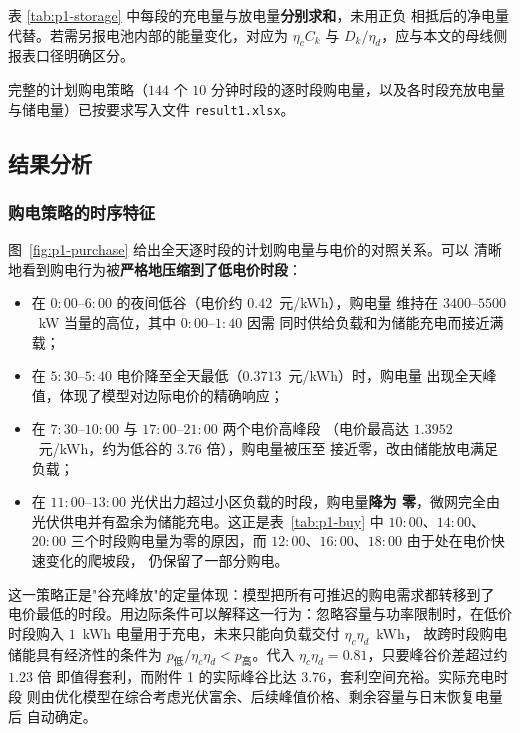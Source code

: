 \documentclass[withoutpreface,bwprint]{cumcmthesis}
\begin{document}
表 \ref{tab:p1-storage} 中每段的充电量与放电量\textbf{分别求和}，未用正负
相抵后的净电量代替。若需另报电池内部的能量变化，对应为 $\eta_c C_k$ 与
$D_k/\eta_d$，应与本文的母线侧报表口径明确区分。

完整的计划购电策略（$144$ 个 $10$ 分钟时段的逐时段购电量，以及各时段充放电量
与储电量）已按要求写入文件 \texttt{result1.xlsx}。

\subsection{结果分析}

\subsubsection{购电策略的时序特征}

图~\ref{fig:p1-purchase} 给出全天逐时段的计划购电量与电价的对照关系。可以
清晰地看到购电行为被\textbf{严格地压缩到了低电价时段}：

\begin{itemize}
  \item 在 $0{:}00$--$6{:}00$ 的夜间低谷（电价约 $0.42$~元/kWh），购电量
        维持在 $3400$--$5500$~kW 当量的高位，其中 $0{:}00$--$1{:}40$ 因需
        同时供给负载和为储能充电而接近满载；
  \item 在 $5{:}30$--$5{:}40$ 电价降至全天最低（$0.3713$~元/kWh）时，购电量
        出现全天峰值，体现了模型对边际电价的精确响应；
  \item 在 $7{:}30$--$10{:}00$ 与 $17{:}00$--$21{:}00$ 两个电价高峰段
        （电价最高达 $1.3952$~元/kWh，约为低谷的 $3.76$ 倍），购电量被压至
        接近零，改由储能放电满足负载；
  \item 在 $11{:}00$--$13{:}00$ 光伏出力超过小区负载的时段，购电量\textbf{降为
        零}，微网完全由光伏供电并有盈余为储能充电。这正是表~\ref{tab:p1-buy}
        中 $10{:}00$、$14{:}00$、$20{:}00$ 三个时段购电量为零的原因，而
        $12{:}00$、$16{:}00$、$18{:}00$ 由于处在电价快速变化的爬坡段，
        仍保留了一部分购电。
\end{itemize}

这一策略正是"谷充峰放"的定量体现：模型把所有可推迟的购电需求都转移到了
电价最低的时段。用边际条件可以解释这一行为：忽略容量与功率限制时，在低价
时段购入 $1$~kWh 电量用于充电，未来只能向负载交付 $\eta_c\eta_d$~kWh，
故跨时段购电储能具有经济性的条件为 $p_{\text{低}}/\eta_c\eta_d <
p_{\text{高}}$。代入 $\eta_c\eta_d = 0.81$，只要峰谷价差超过约 $1.23$ 倍
即值得套利，而附件 1 的实际峰谷比达 $3.76$，套利空间充裕。实际充电时段
则由优化模型在综合考虑光伏富余、后续峰值价格、剩余容量与日末恢复电量后
自动确定。
\end{document}
